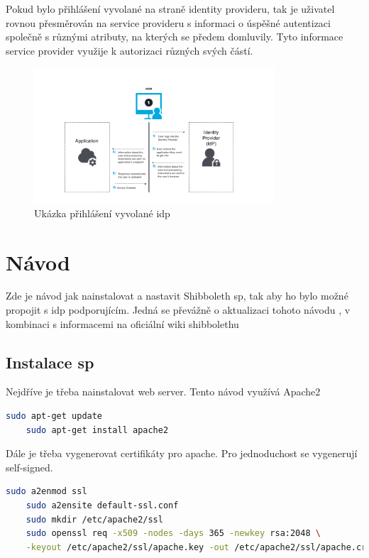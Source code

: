 Pokud bylo přihlášení vyvolané na straně identity provideru, tak je uživatel rovnou přesměrován na service provideru s informaci o úspěšné autentizaci společně s různými atributy, na kterých se předem domluvily.
Tyto informace service provider využije k autorizaci různých svých částí.\cite{SAMLxOIDC}

\begin{figure}[bp]
	\centering
    \includegraphics[width=0.8\textwidth]{obrazky-figures/saml-idp.png}
	\caption{Ukázka přihlášení vyvolané idp\cite{SAMLxOIDC}}
	\label{saml-flow}
\end{figure}
\chapter{Návod}
\label{návod}

Zde je návod jak nainstalovat a nastavit Shibboleth sp, tak aby ho bylo možné propojit s idp podporujícím. Jedná se převážně o aktualizaci tohoto návodu \cite{shibbolethSpInstallation}, v kombinaci s informacemi na oficiální wiki shibbolethu\cite{shibbolethWikiSP}

\section{Instalace sp}

Nejdříve je třeba nainstalovat web server. Tento návod využívá Apache2
\begin{lstlisting}[language=Bash]
    sudo apt-get update
    sudo apt-get install apache2
\end{lstlisting}

Dále je třeba vygenerovat certifikáty pro apache. Pro jednoduchost se vygenerují self-signed.
\begin{lstlisting}[language=Bash]
    sudo a2enmod ssl
    sudo a2ensite default-ssl.conf
    sudo mkdir /etc/apache2/ssl
    sudo openssl req -x509 -nodes -days 365 -newkey rsa:2048 \
    -keyout /etc/apache2/ssl/apache.key -out /etc/apache2/ssl/apache.crt
\end{lstlisting}

